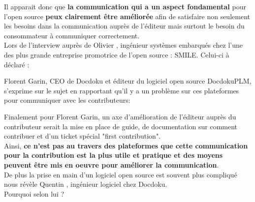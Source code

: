 			Il apparait donc que \textbf{la communication qui a un aspect fondamental} pour l'open source \textbf{peux clairement être améliorée} afin de satisfaire non seulement les besoins dans la communication auprès de l'éditeur mais surtout le besoin du consommateur à communiquer correctement.\\

			Lors de l'interview auprès de Olivier , ingénieur systèmes embarqués chez l'une des plus grande entreprise promotrice de l'open source : SMILE. Celui-ci à déclaré : 

			\begin{center}
				\textit{
				}
			\end{center}

			Florent Garin, CEO de Docdoku et éditeur du logiciel open source DocdokuPLM, s'exprime sur le sujet en rapportant qu'il y a un problème sur ces plateformes pour communiquer avec les contributeurs:

			\begin{center}
				\textit{
				}
			\end{center}

			Finalement pour Florent Garin, un axe d'amélioration de l'éditeur auprès du contributeur serait la mise en place de guide, de documentation sur comment contribuer et d'un ticket spécial "first contribution".\\

			Ainsi, \textbf{ce n'est pas au travers des plateformes que cette communication pour la contribution est la plus utile et pratique et des moyens peuvent être mis en oeuvre pour améliorer la communication}.\\

			De plus la prise en main d'un logiciel open source est souvent plus compliqué nous révèle Quentin , ingénieur logiciel chez Docdoku.\\

			Pourquoi selon lui ?

